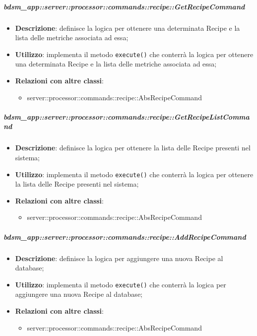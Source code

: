         \subparagraph{bdsm\_app::server::processor::commands::recipe::GetRecipeCommand} %
        \label{subp:bdsm_app_server_processor_commands_recipe_getrecipecommand}
        \begin{itemize}
          \item \textbf{Descrizione}: definisce la logica per ottenere una determinata Recipe e la lista delle metriche associata ad essa;
          \item \textbf{Utilizzo}: implementa il metodo \texttt{execute()} che conterrà la logica per ottenere una determinata Recipe e la lista delle metriche associata ad essa;
          \item \textbf{Relazioni con altre classi}:
            \begin{itemize}
              \item server::processor::commands::recipe::AbsRecipeCommand
            \end{itemize}
        \end{itemize}

        \subparagraph{bdsm\_app::server::processor::commands::recipe::GetRecipeListCommand} %
        \label{subp:bdsm_app_server_processor_commands_recipe_getrecipelistcommand}
        \begin{itemize}
          \item \textbf{Descrizione}: definisce la logica per ottenere la lista delle Recipe presenti nel sistema;
          \item \textbf{Utilizzo}: implementa il metodo \texttt{execute()} che conterrà la logica per ottenere la lista delle Recipe presenti nel sistema;
          \item \textbf{Relazioni con altre classi}:
            \begin{itemize}
              \item server::processor::commands::recipe::AbsRecipeCommand
            \end{itemize}
        \end{itemize}

        \subparagraph{bdsm\_app::server::processor::commands::recipe::AddRecipeCommand} %
        \label{subp:bdsm_app_server_processor_commands_recipe_addrecipecommand}
        \begin{itemize}
          \item \textbf{Descrizione}: definisce la logica per aggiungere una nuova Recipe al database;
          \item \textbf{Utilizzo}: implementa il metodo \texttt{execute()} che conterrà la logica per aggiungere una nuova Recipe al database;
          \item \textbf{Relazioni con altre classi}:
            \begin{itemize}
              \item server::processor::commands::recipe::AbsRecipeCommand
            \end{itemize}
        \end{itemize}

